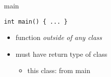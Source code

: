 
\begin{frame}[fragile,label=main]{main}
\begin{lstlisting}
int main() { ... }
\end{lstlisting}
\begin{itemize}
\item function \textit{outside of any class}
\item must have return type of class
\begin{itemize}
\item this class:  from main
\end{itemize}
\end{itemize}
\end{frame}
